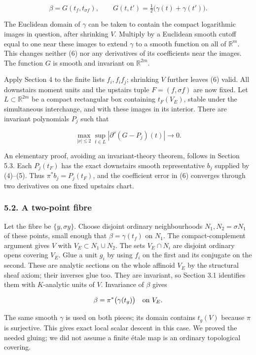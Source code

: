 \documentclass[
  11pt,
]{article}
\begin{document}
\[
\beta=G(t_f,t_{\sigma f}),\qquad
G(t,t')=\tfrac12\bigl(\gamma(t)+\gamma(t')\bigr). \tag{6}
\]

The Euclidean domain of \(\gamma\) can be taken to contain the compact
logarithmic images in question, after shrinking \(V\). Multiply by a
Euclidean smooth cutoff equal to one near these images to extend
\(\gamma\) to a smooth function on all of \(\mathbb R^m\). This changes
neither (6) nor any derivatives of its coefficients near the images. The
function \(G\) is smooth and invariant on \(\mathbb R^{2m}\).

Apply Section 4 to the finite lists \(f_i,f_if_j\); shrinking \(V\)
further leaves (6) valid. All downstairs moment units and the upstairs
tuple \(F=(f,\sigma f)\) are now fixed. Let \(L\subset\mathbb R^{2m}\)
be a compact rectangular box containing \(t_F(V_E)\), stable under the
simultaneous interchange, and with these images in its interior. There
are invariant polynomials \(P_j\) such that

\[
\max_{|\nu|\leq2}\sup_{t\in L}|\partial^\nu(G-P_j)(t)|\longrightarrow0. \tag{7}
\]

An elementary proof, avoiding an invariant-theory theorem, follows in
Section 5.3. Each \(P_j(t_F)\) has the exact downstairs smooth
representative \(b_j\) supplied by (4)--(5). Thus \(\pi^*b_j=P_j(t_F)\),
and the coefficient error in (6) converges through two derivatives on
one fixed upstairs chart.

\subsubsection{5.2. A two-point fibre}\label{a-two-point-fibre}

Let the fibre be \(\{y,\sigma y\}\). Choose disjoint ordinary
neighbourhoods \(N_1,N_2=\sigma N_1\) of these points, small enough that
\(\beta=\gamma(t_f)\) on \(N_1\). The compact-complement argument gives
\(V\) with \(V_E\subset N_1\cup N_2\). The sets \(V_E\cap N_i\) are
disjoint ordinary opens covering \(V_E\). Glue a unit \(g_i\) by using
\(f_i\) on the first and its conjugate on the second. These are analytic
sections on the whole affinoid \(V_E\) by the structural sheaf axiom;
their inverses glue too. They are invariant, so Section 3.1 identifies
them with \(K\)-analytic units of \(V\). Invariance of \(\beta\) gives

\[\beta=\pi^*\bigl(\gamma(t_g)\bigr)\quad\hbox{on }V_E.\]

The same smooth \(\gamma\) is used on both pieces; its domain contains
\(t_g(V)\) because \(\pi\) is surjective. This gives exact local scalar
descent in this case. We proved the needed gluing; we did not assume a
finite étale map is an ordinary topological covering.
\end{document}
